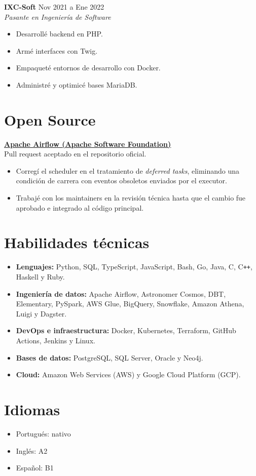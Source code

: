 \documentclass[a4paper,10pt]{article}
\begin{document}
\textbf{IXC-Soft} \hfill Nov 2021 a Ene 2022 \\
\textit{Pasante en Ingeniería de Software}
\begin{itemize}
    \item Desarrollé backend en PHP.
    \item Armé interfaces con Twig.
    \item Empaqueté entornos de desarrollo con Docker.
    \item Administré y optimicé bases MariaDB.
\end{itemize}

\section*{Open Source}

\textbf{\href{https://github.com/apache/airflow/pull/66431}{Apache Airflow (Apache Software Foundation)}} \\
Pull request aceptado en el repositorio oficial.
\begin{itemize}
    \item Corregí el scheduler en el tratamiento de \textit{deferred tasks}, eliminando una condición de carrera con eventos obsoletos enviados por el executor.
    \item Trabajé con los maintainers en la revisión técnica hasta que el cambio fue aprobado e integrado al código principal.
\end{itemize}

\section*{Habilidades técnicas}

\begin{itemize}
    \item \textbf{Lenguajes:} Python, SQL, TypeScript, JavaScript, Bash, Go, Java, C, C\texttt{++}, Haskell y Ruby.
    \item \textbf{Ingeniería de datos:} Apache Airflow, Astronomer Cosmos, DBT, Elementary, PySpark, AWS Glue, BigQuery, Snowflake, Amazon Athena, Luigi y Dagster.
    \item \textbf{DevOps e infraestructura:} Docker, Kubernetes, Terraform, GitHub Actions, Jenkins y Linux.
    \item \textbf{Bases de datos:} PostgreSQL, SQL Server, Oracle y Neo4j.
    \item \textbf{Cloud:} Amazon Web Services (AWS) y Google Cloud Platform (GCP).
\end{itemize}

\section*{Idiomas}

\begin{itemize}
    \item Portugués: nativo
    \item Inglés: A2
    \item Español: B1
\end{itemize}
\end{document}
